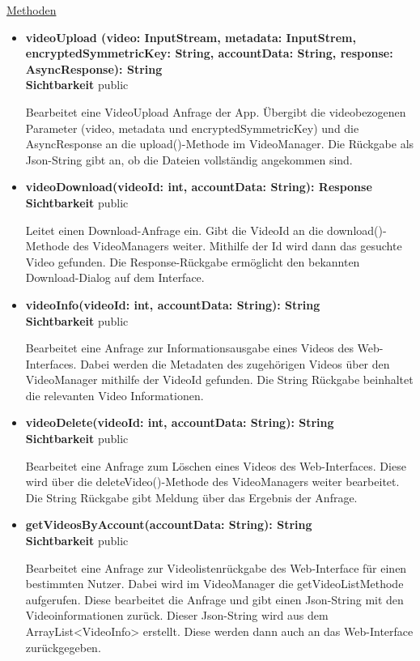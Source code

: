 \underline{Methoden}
\begin{itemize}
\itemsep0pt
\item \textbf{videoUpload (video: InputStream, metadata: InputStrem, encryptedSymmetricKey: String, accountData: String, response: AsyncResponse): String}\hfill\\
\textbf{Sichtbarkeit} public

Bearbeitet eine VideoUpload Anfrage der App. Übergibt die videobezogenen Parameter (video, metadata und encryptedSymmetricKey) und die AsyncResponse an die upload()-Methode im VideoManager. Die Rückgabe als Json-String gibt an, ob die Dateien vollständig angekommen sind. 

\item \textbf{videoDownload(videoId: int, accountData: String): Response}\hfill\\
\textbf{Sichtbarkeit} public

Leitet einen Download-Anfrage ein. Gibt die VideoId an die download()-Methode des VideoManagers weiter. Mithilfe der Id wird dann das gesuchte Video gefunden. Die Response-Rückgabe ermöglicht den bekannten Download-Dialog auf dem Interface.

\item \textbf{videoInfo(videoId: int, accountData: String): String}\hfill\\
\textbf{Sichtbarkeit} public

Bearbeitet eine Anfrage zur Informationsausgabe eines Videos des Web-Interfaces. Dabei werden die Metadaten des zugehörigen Videos über den VideoManager mithilfe der VideoId gefunden. Die String Rückgabe beinhaltet die relevanten Video Informationen.

\item \textbf{videoDelete(videoId: int, accountData: String): String}\hfill\\
\textbf{Sichtbarkeit} public

Bearbeitet eine Anfrage zum Löschen eines Videos des Web-Interfaces. Diese wird über die deleteVideo()-Methode des VideoManagers weiter bearbeitet. Die String Rückgabe gibt Meldung über das Ergebnis der Anfrage.

\item \textbf{getVideosByAccount(accountData: String): String}\hfill\\
\textbf{Sichtbarkeit} public  

Bearbeitet eine Anfrage zur Videolistenrückgabe des Web-Interface für einen bestimmten Nutzer. Dabei wird im VideoManager die getVideoListMethode aufgerufen. Diese bearbeitet die Anfrage und gibt einen Json-String mit den Videoinformationen zurück. Dieser Json-String wird aus dem ArrayList<VideoInfo> erstellt. Diese werden dann auch an das Web-Interface zurückgegeben. 


\end{itemize}
